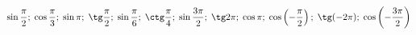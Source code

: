 \begin{ex}[type=calculate]
	\begin{condition}
		\( \sin\dfrac{\pi}{2};\;\cos\dfrac{\pi}{3};\;\sin\pi;\;\tg\dfrac{\pi}{2};\;\sin\dfrac{\pi}{6};\;\ctg\dfrac{\pi}{4};\;\sin\dfrac{3\pi}{2};\;\tg2\pi;\;\cos\pi;\;\cos\left( -\dfrac{\pi}{2} \right);\;\tg(-2\pi);\;\cos\left( -\dfrac{3\pi}{2} \right) \)
	\end{condition}
\end{ex}